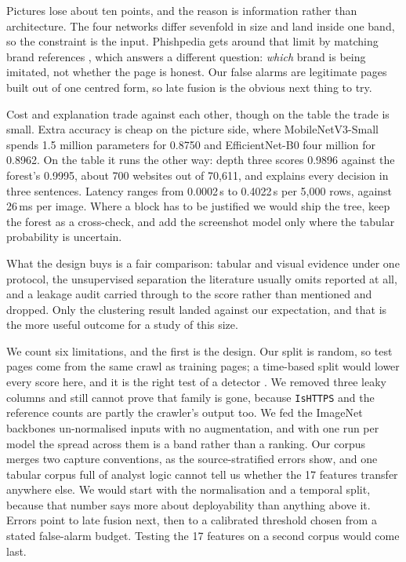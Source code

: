 \documentclass[11pt,journal,a4paper]{IEEEtran}
\begin{document}
Pictures lose about ten points, and the reason is information rather than architecture. The four networks differ
sevenfold in size and land inside one band, so the constraint is the input. Phishpedia gets around that limit by
matching brand references \cite{lin2021phishpedia}, which answers a different question: \emph{which} brand is
being imitated, not whether the page is honest. Our false alarms are legitimate pages built out of one centred
form, so late fusion is the obvious next thing to try.

Cost and explanation trade against each other, though on the table the trade is small. Extra accuracy is cheap on
the picture side, where MobileNetV3-Small spends 1.5 million parameters for 0.8750 and EfficientNet-B0 four
million for 0.8962. On the table it runs the other way: depth three scores 0.9896 against the forest's 0.9995,
about 700 websites out of 70{,}611, and explains every decision in three sentences. Latency ranges from
0.0002\,s to 0.4022\,s per 5{,}000 rows, against 26\,ms per image. Where a block has to be justified we would
ship the tree, keep the forest as a cross-check, and add the screenshot model only where the tabular probability
is uncertain.

What the design buys is a fair comparison: tabular and visual evidence under one protocol, the unsupervised
separation the literature usually omits reported at all, and a leakage audit carried through to the score rather
than mentioned and dropped. Only the clustering result landed against our expectation, and that is the more
useful outcome for a study of this size.

We count six limitations, and the first is the design. Our split is random, so test pages come from the same crawl
as training pages; a time-based split would lower every score here, and it is the right test of a detector
\cite{marchal2014phishstorm}. We removed three leaky columns and still cannot prove that family is gone, because
\texttt{IsHTTPS} and the reference counts are partly the crawler's output too. We fed the ImageNet backbones
un-normalised inputs with no augmentation, and with one run per model the spread across them is a band rather than
a ranking. Our corpus merges two capture conventions, as the source-stratified errors show, and one tabular corpus
full of analyst logic cannot tell us whether the 17 features transfer anywhere else. We would start with the
normalisation and a temporal split, because that number says more about deployability than anything above it.
Errors point to late fusion next, then to a calibrated threshold chosen from a stated false-alarm budget. Testing
the 17 features on a second corpus would come last.
\end{document}
